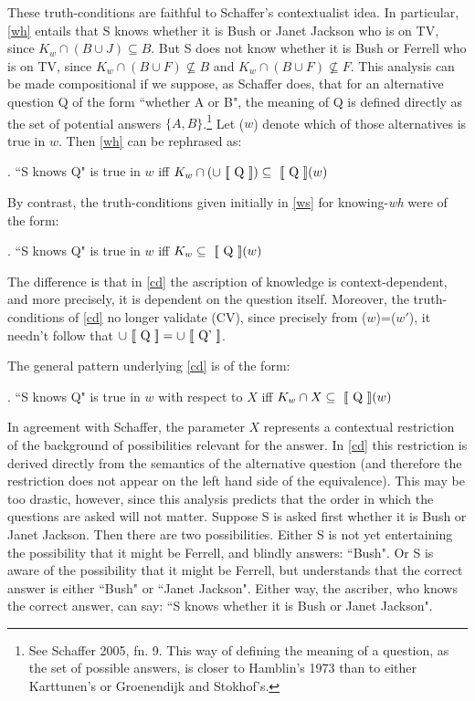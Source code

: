These truth-conditions are faithful to Schaffer's contextualist
idea. In particular, \ref{wh} entails that S knows whether it is
Bush or Janet Jackson who is on TV, since $K_{w}\cap (B \cup
J)\subseteq B$. But S does not know whether it is Bush or Ferrell
who is on TV, since $K_{w}\cap(B \cup F)\nsubseteq B$ and
$K_{w}\cap(B \cup F)\nsubseteq F$. This analysis can be made
compositional if we suppose, as Schaffer does, that for an
alternative question Q of the form ``whether A or B", the meaning
of Q is defined directly as the set of potential answers $\{A,
B\}$.\footnote{See Schaffer 2005, fn. 9. This way of defining the
meaning of a question, as the set of possible answers, is closer
to Hamblin's 1973 than to either Karttunen's or Groenendijk and
Stokhof's.} Let ($w$) denote which of those alternatives is
true in $w$. Then \ref{wh} can be rephrased as:

\ex. \label{cd} ``S knows Q" is true in $w$ iff $K_{w}\cap
(\cup\mbox{ $[\![$ Q $]\!]$}) \subseteq \mbox{ $[\![$ Q $]\!]$}(w)$

%
By contrast, the truth-conditions given initially in \ref{ws} for
knowing-\emph{wh} were of the form:

\ex. \label{cf} ``S knows Q" is true in $w$ iff $K_{w} \subseteq
\mbox{ $[\![$ Q $]\!]$}(w)$

%

\noindent The difference is that in \ref{cd} the ascription of
knowledge is context-dependent, and more precisely, it is
dependent on the question itself. Moreover, the truth-conditions
of \ref{cd} no longer validate (CV), since precisely from
($w$)=($w'$), it needn't follow that
$\cup\mbox{ $[\![$ Q $]\!]$}=\cup\mbox{ $[\![$ Q' $]\!]$}$.

The general pattern underlying \ref{cd} is of the form:

\ex. \label{gen} ``S knows Q" is true in $w$ with respect to $X$
iff $K_w \cap X \subseteq \mbox{ $[\![$ Q $]\!]$}(w)$

In agreement with Schaffer, the parameter $X$ represents a
contextual restriction of the background of possibilities relevant
for the answer. In \ref{cd} this restriction is derived directly
from the semantics of the alternative question (and therefore the
restriction does not appear on the left hand side of the
equivalence). This may be too drastic, however, since this
analysis predicts that the order in which the questions are asked
will not matter. Suppose S is asked first whether it is Bush or
Janet Jackson. Then there are two possibilities. Either S is not
yet entertaining the possibility that it might be Ferrell, and
blindly answers: ``Bush". Or S is aware of the possibility that it
might be Ferrell, but understands that the correct answer is
either ``Bush" or ``Janet Jackson". Either way, the ascriber, who
knows the correct answer, can say: ``S knows whether it is Bush or
Janet Jackson".

